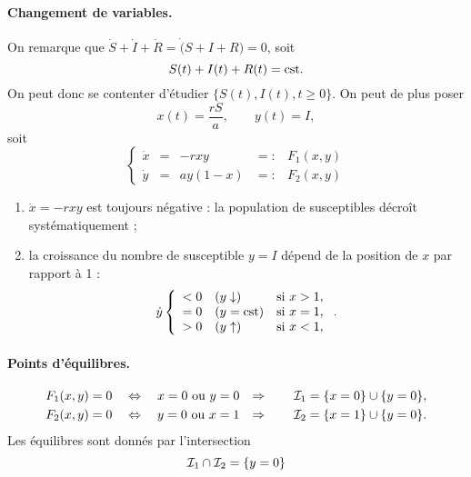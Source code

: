 \paragraph*{Changement de variables.}
On remarque que $\dot S + \dot I + \dot R = \dot (S + I + R) = 0$, soit 
$$
S(t) + I(t) + R(t) = \text{cst}.
$$
On peut donc se contenter d'étudier $\{S(t), I(t), t \geq 0\}$. On peut de plus poser 
$$
x(t) = \frac{rS}a, \qquad y(t) = I,
$$
soit
$$
\left\{\begin{array}{rclcl}
        \dot x & = & -r x y & =: & F_1(x, y) \\
        \dot y & = & a y (1-x) & =: & F_2(x, y)
       \end{array}\right.
$$

\remarks
\begin{enumerate}
  \item $\dot x = - rxy$ est toujours négative : la population de susceptibles décroît systématiquement ; 
  \item la croissance du nombre de susceptible $y = I$ dépend de la position de $x$ par rapport à 1 :
  $$
  \dot y \left\{\begin{array}{lll}
                < 0 & (y \downarrow) & \text{si } x > 1, \\
                = 0  & (y = \text{cst}) & \text{si } x = 1, \\
                > 0  & (y \uparrow) & \text{si } x < 1,
                \end{array}\right..
  $$
\end{enumerate}


\paragraph*{Points d'équilibres.}
\begin{align*}
  F_1(x, y) & = 0 \quad \Leftrightarrow \quad x = 0 \text{ ou } y = 0 &
  \Rightarrow \qquad \mathcal{I}_1 & = \{x = 0\} \cup \{y = 0\}, \\
  F_2(x, y) & = 0 \quad \Leftrightarrow \quad y = 0 \text{ ou } x = 1 &
  \Rightarrow \qquad \mathcal{I}_2 & = \{x = 1\} \cup \{y = 0\}.
\end{align*}
Les équilibres sont donnés par l'intersection 
$$
\mathcal{I}_1 \cap \mathcal{I}_2 = \{y = 0\}
$$

